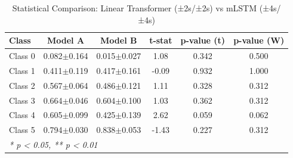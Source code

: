 \begin{table}[htbp]
\centering
\caption{Statistical Comparison: Linear Transformer (±2s/±2s) vs mLSTM (±4s/±4s)}
\label{tab:comparison_class_linear_transformer_±2s_±2s_vs_mlstm_±4s_±4s}
\begin{tabular}{lccccc}
\toprule
\textbf{Class} & \textbf{Model A} & \textbf{Model B} & \textbf{t-stat} & \textbf{p-value (t)} & \textbf{p-value (W)} \\
\midrule
Class 0 & 0.082$\pm$0.164 & 0.015$\pm$0.027 & 1.08 & 0.342 & 0.500 \\
Class 1 & 0.411$\pm$0.119 & 0.417$\pm$0.161 & -0.09 & 0.932 & 1.000 \\
Class 2 & 0.567$\pm$0.064 & 0.486$\pm$0.121 & 1.11 & 0.328 & 0.312 \\
Class 3 & 0.664$\pm$0.046 & 0.604$\pm$0.100 & 1.03 & 0.362 & 0.312 \\
Class 4 & 0.605$\pm$0.099 & 0.425$\pm$0.139 & 2.62 & 0.059 & 0.062 \\
Class 5 & 0.794$\pm$0.030 & 0.838$\pm$0.053 & -1.43 & 0.227 & 0.312 \\
\bottomrule
\multicolumn{6}{l}{\textit{* p < 0.05, ** p < 0.01}} \\
\end{tabular}
\end{table}